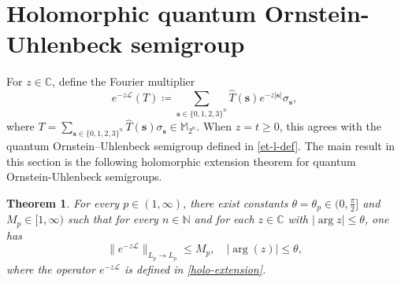 \documentclass{amsbook}
\newtheorem{theorem}{Theorem}[chapter]
\theoremstyle{definition}
\theoremstyle{remark}
\numberwithin{section}{chapter}
\numberwithin{equation}{chapter}
\newcommand{\M}{\mathbb{M}}
\newcommand{\1}{\mathbf{1}}
\newcommand{\s}{\mathbf{s}}
\begin{document}
\section{Holomorphic quantum Ornstein-Uhlenbeck semigroup}

For $z\in\mathbb{C}$, define the Fourier multiplier
\begin{equation}\label{holo-extension}
e^{-z\mathcal L}(T)\coloneqq \sum_{\s\in\{0,1,2,3\}^{n}} \widehat T(\s)e^{-z|\s|}\sigma_{\s},
\end{equation}
where $T=\sum_{\s\in\{0,1,2,3\}^{n}}\widehat T(\s)\sigma_{\s}\in \M_{2^n}$. When $z=t\ge0$, this agrees with the quantum Ornstein--Uhlenbeck semigroup defined in \eqref{et-l-def}. The main result in this section is the following holomorphic extension theorem for quantum Ornstein-Uhlenbeck semigroups.

\begin{theorem}\label{e-zl-b}
For every $p \in(1, \infty)$, there exist constants $\theta=\theta_p \in(0, \frac{\pi}{2}]$ and $M_p \in[1, \infty)$ such that for every $n \in \mathbb{N}$ and for each $z\in \mathbb{C}$ with $|\arg z| \leq \theta$, one has
\begin{equation}\label{ezl-b}
\|e^{-z \mathcal{L}}\|_{L_{p} \rightarrow L_{p}} \leq M_p,\quad |\arg(z)|\leq \theta,
\end{equation}
where the operator $e^{-z\mathcal{L}}$ is defined in \eqref{holo-extension}.
\end{theorem}
\end{document}

